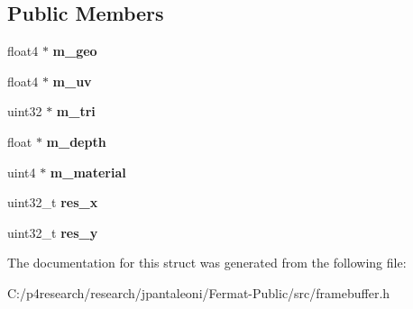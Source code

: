 \subsection*{Public Members}
\begin{DoxyCompactItemize}
\item 
\mbox{\label{struct_g_buffer_view_a757a5450248bcf1e05809ed35075da29}} 
float4 $\ast$ {\bfseries m\+\_\+geo}
\item 
\mbox{\label{struct_g_buffer_view_a30394f2a2ee6e5710821a40ae35dadc6}} 
float4 $\ast$ {\bfseries m\+\_\+uv}
\item 
\mbox{\label{struct_g_buffer_view_a98b10ede6c0960459c6c9d4caadd75f3}} 
uint32 $\ast$ {\bfseries m\+\_\+tri}
\item 
\mbox{\label{struct_g_buffer_view_a75c3a2a932847227ac9c055d6c92ce34}} 
float $\ast$ {\bfseries m\+\_\+depth}
\item 
\mbox{\label{struct_g_buffer_view_ae2e34ca44445d2a99f53a7f000982aa0}} 
uint4 $\ast$ {\bfseries m\+\_\+material}
\item 
\mbox{\label{struct_g_buffer_view_a78845ee3dedfea58df72594aa289d301}} 
uint32\+\_\+t {\bfseries res\+\_\+x}
\item 
\mbox{\label{struct_g_buffer_view_ab0fca70c1b73866d77c6fe891dd10be7}} 
uint32\+\_\+t {\bfseries res\+\_\+y}
\end{DoxyCompactItemize}


The documentation for this struct was generated from the following file\+:\begin{DoxyCompactItemize}
\item 
C\+:/p4research/research/jpantaleoni/\+Fermat-\/\+Public/src/framebuffer.\+h\end{DoxyCompactItemize}
